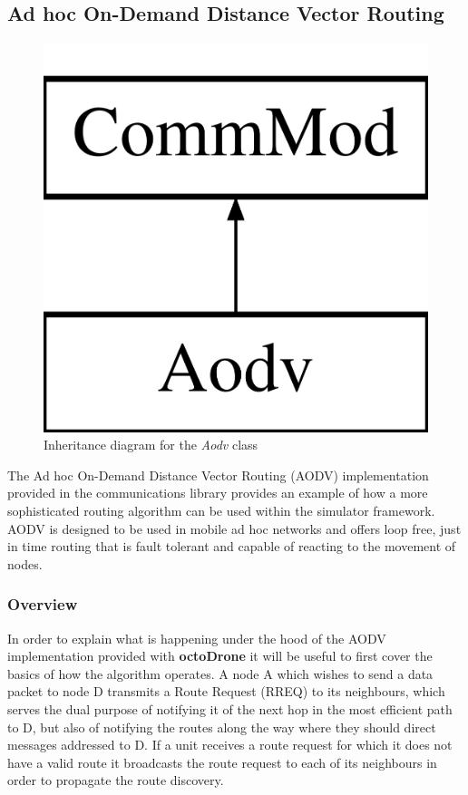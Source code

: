 \subsection{Ad hoc On-Demand Distance Vector Routing}
\begin{figure}
\centering	
\includegraphics[scale=0.2]{../documentation/latex/class_aodv}	
\caption{Inheritance diagram for the \textit{Aodv} class}
\end{figure}

The Ad hoc On-Demand Distance Vector Routing (AODV) implementation provided in the communications library provides an example of how a more sophisticated routing algorithm can be used within the simulator framework. AODV is designed to be used in mobile ad hoc networks and offers loop free, just in time routing that is fault tolerant and capable of reacting to the movement of nodes.

\subsubsection{Overview}
In order to explain what is happening under the hood of the AODV implementation provided with \textbf{octoDrone} it will be useful to first cover the basics of how the algorithm operates. A node A which wishes to send a data packet to node D transmits a Route Request (RREQ) to its neighbours, which serves the dual purpose of notifying it of the next hop in the most efficient path to D, but also of notifying the routes along the way where they should direct messages addressed to D. If a unit receives a route request for which it does not have a valid route it broadcasts the route request to each of its neighbours in order to propagate the route discovery.

